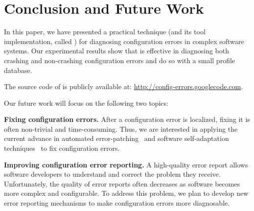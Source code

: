 \section{Conclusion and Future Work}

In this paper, we have presented a practical technique (and
its tool implementation, called \ourtool) for diagnosing
configuration errors in complex software systems.
Our experimental results show that \ourtool is effective in
diagnosing both crashing and non-crashing configuration errors
and do so with a small profile database.

The source code of \ourtool is publicly available at:
\url{http://config-errors.googlecode.com}.

\vspace{1mm}

Our future
work will focus on the following two topics:

\textbf{Fixing configuration errors.} After a configuration error
is localized, fixing it is
often non-trivial and time-consuming. Thus, we
are interested in applying the current advance in
automated error-patching~\cite{rangefix} and
software self-adaptation techniques~\cite{Wang:2009:STR, Mori:2011:LSU} to
fix configuration errors.


\textbf{Improving configuration error reporting.} A high-quality
error report allows software developers to understand and correct the problem
they receive. 
Unfortunately, the quality of error reports often
decreases as software becomes more complex and configurable.
To address this problem, we plan to develop new error reporting mechanisms
to make configuration errors
more diagnosable.


